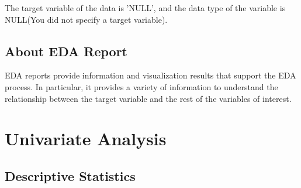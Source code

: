 \documentclass{book}\usepackage[]{graphicx}\usepackage[]{color}
\begin{document}
The target variable of the data is 'NULL', and the data type of the variable is NULL(You did not specify a target variable).

\section{About EDA Report}
EDA reports provide information and visualization results that support the EDA process. In particular, it provides a variety of information to understand the relationship between the target variable and the rest of the variables of interest.

\chapter{Univariate Analysis}
\section{Descriptive Statistics}
\end{document}
